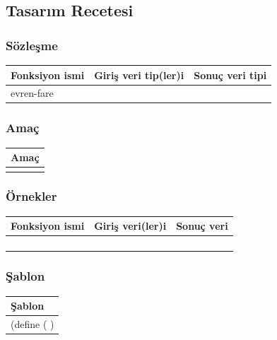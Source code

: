 \documentclass[12pt, a4paper]{article}
\newcommand\fillin[1][3cm]{\makebox[#1]{\dotfill}}
\begin{document}

\newpage
\subsection*{Tasarım Recetesi}
\subsubsection*{Sözleşme}
\begin{tabular}{| p{4cm} | p{8cm} | p{4cm} |  }
\hline			
Fonksiyon ismi&Giriş veri tip(ler)i&Sonuç veri tipi\\
\hline
evren-fare& & \\[10ex]
\hline  
\end{tabular}

\subsubsection*{Amaç}
\begin{tabular}{| p{17cm} |  }
\hline			
Amaç\\
\hline
 \\[10ex]
\hline  
\end{tabular}

\subsubsection*{Örnekler}
\begin{tabular}{| p{4cm} | p{8cm} | p{4cm} |  }
\hline			
Fonksiyon ismi&Giriş veri(ler)i&Sonuç veri\\
\hline
& & \\[6ex]
\hline  
& & \\[6ex]
\hline  
& & \\[6ex]
\hline  
& & \\[6ex]
\hline  
\end{tabular}

\subsubsection*{Şablon}
\begin{tabular}{| p{17cm} |  }
\hline			
Şablon\\
\hline
\vspace{0,2cm}
(define (\fillin[2cm] \hspace{1cm}  \fillin[8cm] ) \\[30ex]
\hline  
\end{tabular}
\end{document}
